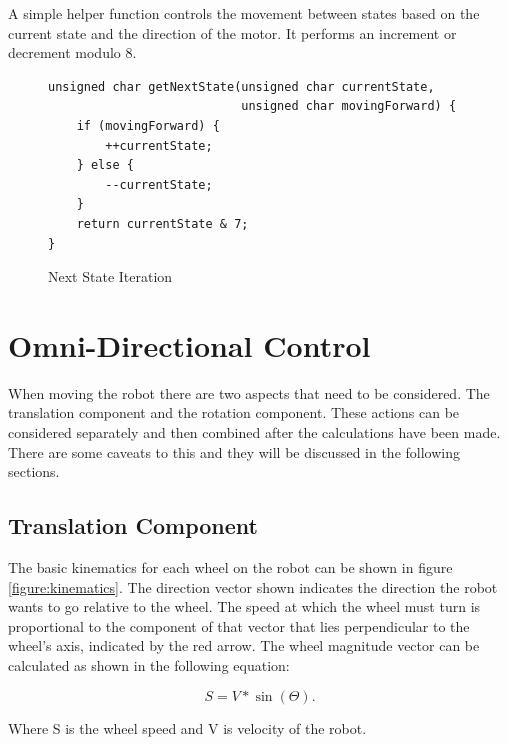 A simple helper function controls the movement between states based on the current state and the direction of the motor.  It performs an increment or decrement modulo 8.

\begin{figure}[H]
\begin{lstlisting}
unsigned char getNextState(unsigned char currentState, 
                           unsigned char movingForward) {
    if (movingForward) {
        ++currentState;
    } else {
        --currentState;
    }
    return currentState & 7;
}
\end{lstlisting}
\caption{Next State Iteration}
\label{figure:next_state_iter}
\end{figure}


\section{Omni-Directional Control}



When moving the robot there are two aspects that need to be considered. The translation component and the rotation component. These actions can be considered separately and then combined after the calculations have been made. There are some caveats to this and they will be discussed in the following sections. 

\subsection{Translation Component}

The basic kinematics for each wheel on the robot can be shown in figure \ref{figure:kinematics}. The direction vector shown indicates the direction the robot wants to go relative to the wheel. The speed at which the wheel must turn is proportional to the component of that vector that lies perpendicular to the wheel’s axis, indicated by the red arrow. The wheel magnitude vector can be calculated as shown in the following equation:

\begin{equation}
S = V * \sin (\Theta) .
\end{equation}

Where S is the wheel speed and V is velocity of the robot.


